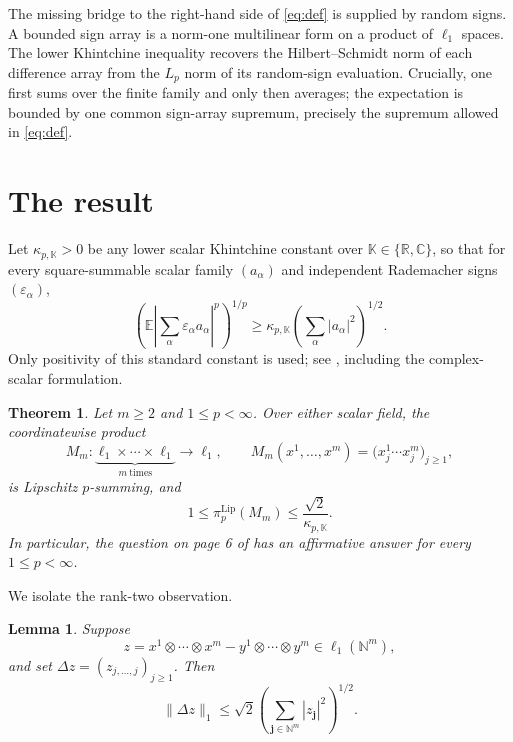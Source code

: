 \documentclass[11pt]{article}
\newtheorem{theorem}{Theorem}
\newtheorem{lemma}{Lemma}
\newcommand{\K}{\mathbb K}
\newcommand{\N}{\mathbb N}
\newcommand{\Lip}{\mathrm{Lip}}
\begin{document}
The missing bridge to the right-hand side of \eqref{eq:def} is supplied by
random signs.  A bounded sign array is a norm-one multilinear form on a product
of $\ell_1$ spaces.  The lower Khintchine inequality recovers the
Hilbert--Schmidt norm of each difference array from the $L_p$ norm of its
random-sign evaluation.  Crucially, one first sums over the finite family and
only then averages; the expectation is bounded by one common sign-array
supremum, precisely the supremum allowed in \eqref{eq:def}.

\section{The result}

Let $\kappa_{p,\K}>0$ be any lower scalar Khintchine constant over
$\K\in\{\mathbb R,\mathbb C\}$, so that for every square-summable scalar
family $(a_\alpha)$ and independent Rademacher signs $(\varepsilon_\alpha)$,
\begin{equation}\label{eq:khin}
 \left(\mathbb E\left|\sum_\alpha
 \varepsilon_\alpha a_\alpha\right|^p\right)^{1/p}
 \ge \kappa_{p,\K}\left(\sum_\alpha|a_\alpha|^2\right)^{1/2}.
\end{equation}
Only positivity of this standard constant is used; see
\cite{Khintchine1923,Kahane1985}, including the complex-scalar formulation.

\begin{theorem}\label{thm:main}
Let $m\ge2$ and $1\le p<\infty$.  Over either scalar field, the coordinatewise
product
\[
 M_m:\underbrace{\ell_1\times\cdots\times\ell_1}_{m\ \mathrm{times}}
 \longrightarrow\ell_1,
 \qquad
 M_m(x^1,\ldots,x^m)=\bigl(x^1_j\cdots x^m_j\bigr)_{j\ge1},
\]
is Lipschitz $p$-summing, and
\[
 1\le \pi_p^{\Lip}(M_m)\le \frac{\sqrt2}{\kappa_{p,\K}}.
\]
In particular, the question on page 6 of \cite{AnguloFernandez2020} has an
affirmative answer for every $1\le p<\infty$.
\end{theorem}

We isolate the rank-two observation.

\begin{lemma}\label{lem:diag}
Suppose
\[
 z=x^1\otimes\cdots\otimes x^m-y^1\otimes\cdots\otimes y^m
 \in \ell_1(\N^m),
\]
and set $\Delta z=(z_{j,\ldots,j})_{j\ge1}$.  Then
\begin{equation}\label{eq:diag}
 \|\Delta z\|_1\le \sqrt2\left(\sum_{\mathbf j\in\N^m}
 |z_{\mathbf j}|^2\right)^{1/2}.
\end{equation}
\end{lemma}
\end{document}

